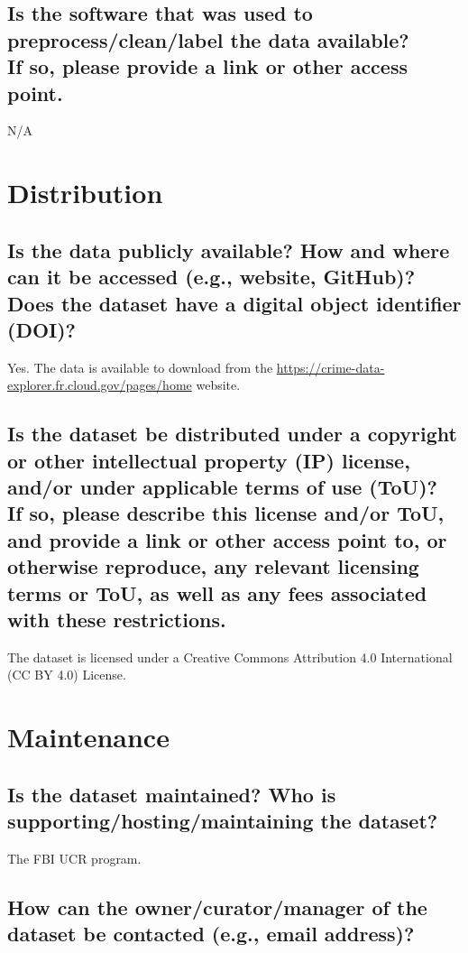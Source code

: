 \documentclass[letterpaper, 10 pt, conference]{ieeeconf}  %
\newcommand{\subtitle}[1]{{\\ \small \normalfont \color{purple} #1}}
\begin{document}
\subsection{Is the software that was used to preprocess/clean/label the data available? \subtitle{If so, please provide a link or other access point.}}

N/A

\section{Distribution}

\subsection{Is the data publicly available? How and where can it be accessed (e.g., website, GitHub)? \subtitle{Does the dataset have a digital object identifier (DOI)?}}

Yes. The data is available to download from the \href{Crime Data Explorer}{https://crime-data-explorer.fr.cloud.gov/pages/home} website.

\subsection{Is the dataset be distributed under a copyright or other intellectual property (IP) license, and/or under applicable terms of use (ToU)? \subtitle{If so, please describe this license and/or ToU, and provide a link or other access point to, or otherwise reproduce, any relevant licensing terms or ToU, as well as any fees associated with these restrictions.}}

The dataset is licensed under a Creative Commons Attribution 4.0 International (CC BY 4.0) License.

\section{Maintenance}

\subsection{Is the dataset maintained? Who is supporting/hosting/maintaining the dataset?}

The FBI UCR program.

\subsection{How can the owner/curator/manager of the dataset be contacted (e.g., email address)?}
\end{document}
